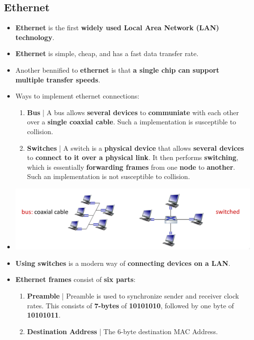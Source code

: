 \documentclass{article}
\begin{document}
    \subsection*{Ethernet}
    \begin{itemize}
        \item \textbf{Ethernet} is the first \textbf{widely used Local Area Network (LAN) technology}.
        \item \textbf{Ethernet} is simple, cheap, and has a fast data transfer rate.
        \item Another bennified to \textbf{ethernet} is that \textbf{a single chip can support multiple transfer speeds}.
        \item Ways to implement ethernet connections:
        \begin{enumerate}
            \item \textbf{Bus} | A bus allows \textbf{several devices} to \textbf{communiate} with each other over a \textbf{single coaxial cable}. Such a implementation is susceptible to collision.
            \item \textbf{Switches} | A switch is a \textbf{physical device} that allows \textbf{several devices} to \textbf{connect to it over a physical link}. It then performs \textbf{switching}, which is essentially \textbf{forwarding frames} from one \textbf{node} to \textbf{another}. Such an implementation is not susceptible to collision.
        \end{enumerate}
        \item[] \includegraphics[width=\textwidth - 25pt]{images/Ethernet-Connections.png}
        \item \textbf{Using switches} is a modern way of \textbf{connecting devices on a LAN}.
        \item \textbf{Ethernet frames} consist of \textbf{six parts}:
        \begin{enumerate}
            \item \textbf{Preamble} | Preamble is used to synchronize sender and receiver clock rates. This consists of \textbf{7-bytes} of \textbf{10101010}, followed by one byte of \textbf{10101011}.
            \item \textbf{Destination Address} | The 6-byte destination MAC Address.

\end{enumerate}
\end{itemize}
\end{document}
